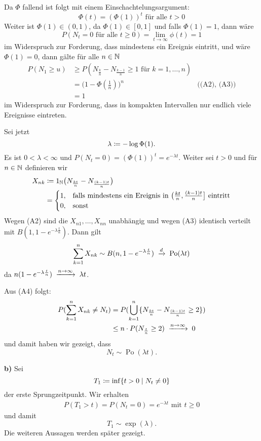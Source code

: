\documentclass[a4paper,twoside,DIV15,BCOR12mm]{scrbook}
\begin{document}
\begin{beweis}
Da $\Phi$ fallend ist folgt mit einem Einschachtelungsargument: 
\[
\Phi(t) = (\Phi(1))^t\text{ für alle } t >0
\]
Weiter ist $\Phi(1) \in (0,1)$, da $\Phi(1) \in[0,1]$ und falls $\Phi(1)=1$, dann wäre 
\[
P(N_t = 0 \text{ für alle } t\ge 0)= \lim_{t\to\infty} \phi(t) = 1
\]
im Widerspruch zur Forderung, dass mindestens ein Ereignis eintritt, und wäre $\Phi(1) = 0$, dann gälte für alle $n\in \mathbb{N}$
\begin{align*}
P(N_1\ge u) 
&\ge P(N_{\frac kn} - N_{\frac {k-1}n} \ge 1 \text{ für } k =1,\ldots,n)\\
&= \Big(1-\Phi(\frac 1n)\Big) ^n &\text{((A2), (A3))} \\
&= 1
\end{align*}
im Widerspruch zur Forderung, dass in kompakten Intervallen nur endlich viele Ereignisse eintreten.

Sei jetzt 
\[
\lambda \da - \log \Phi(1).
\]
Es ist $0<\lambda <\infty$ und $P(N_t=0)= (\Phi(1))^t = e^{-\lambda t}$. Weiter sei $t>0$ und für $n\in \mathbb{N}$ definieren wir
\begin{align*}
X_{nk} &\da 1_{\MdN}\big(N_{\frac{kt}n} - N_{\frac{(k-1)t}n}\big)\\
&= 
\begin{cases}
1, &\text{falls mindestens ein Ereignis in $\big(\frac{kt}n, \frac{(k-1)t}n\big]$ eintritt}\\
0, &\text{sonst}
\end{cases}
\end{align*}
Wegen (A2) sind die $X_{n1},\ldots,X_{nn}$ unabhängig und wegen (A3) identisch verteilt mit $B(1,1-e^{-\lambda \frac tn})$. Dann gilt
\begin{align*}
\sum_{k=1}^n X_{nk} \sim B(n,1-e^{-\lambda \frac tn}) \tomit d \operatorname{Po}(\lambda t)
\end{align*}
da $n(1-e^{-\lambda \frac tn}) \tomit{n\to \infty} \lambda t$.

Aus (A4) folgt:
\begin{align*}
P(\sum_{k=1}^n X_{nk} \ne N_t) 
&= P(\bigcup_{k=1}^n\{N_{\frac {kt}n} - N_{ \frac{(k-1)t}n} \ge 2\})\\
&\le n \cdot P(N_{\frac tn} \ge 2) \tomit {n\to \infty} 0
\end{align*}
und damit haben wir gezeigt, dass
\[
N_t \sim \operatorname{Po}(\lambda t).
\]

\textbf{b)} Sei
\[
T_1 \da \inf \{t>0\mid N_t \ne 0\}
\]
der erste Sprungzeitpunkt. Wir erhalten
\begin{align*}
P(T_1 > t) = P(N_t = 0) = e^{-\lambda t}\text{ mit } t \ge 0
\end{align*} und damit
\[
T_1 \sim \exp(\lambda).
\]
Die weiteren Aussagen werden später gezeigt.
\end{beweis}
\end{document}
